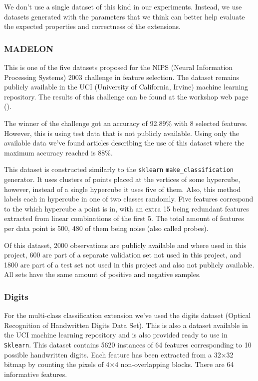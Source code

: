 We don't use a single dataset of this kind in our experiments. Instead, we use datasets generated with the parameters that we think can better help evaluate the expected properties and correctness of the extensions.

\subsubsection*{MADELON}
\label{sec:ch5.data.madelon}

This is one of the five datasets proposed for the NIPS (Neural Information Processing Systems) 2003 challenge in feature selection. The dataset remains publicly available in the UCI (University of California, Irvine) machine learning repository. The results of this challenge can be found at the workshop web page (\cite{guyon_result_2004}).

The winner of the challenge got an accuracy of 92.89\% with 8 selected features. However, this is using test data that is not publicly available. Using only the avail\-able data we've found articles describing the use of this dataset where the maximum accuracy reached is 88\%. 

This dataset is constructed similarly to the \texttt{sklearn} \texttt{make\_classification} gen\-er\-a\-tor. It uses clusters of points placed at the vertices of some hypercube, however, instead of a single hypercube it uses five of them. Also, this method labels each in hypercube in one of two classes randomly. Five features correspond to the which hypercube a point is in, with an extra 15 being redundant features extracted from linear combinations of the first 5. The total amount of features per data point is 500, 480 of them being noise (also called probes).

Of this dataset, 2000 observations are publicly available and where used in this project, 600 are part of a separate validation set not used in this project, and 1800 are part of a test set not used in this project and also not publicly available. All sets have the same amount of positive and negative samples.

\subsubsection*{Digits}

For the multi-class classification extension we've used the digits dataset (Optical Recognition of Handwritten Digits Data Set). This is also a dataset available in the UCI machine learning repository and is also provided ready to use in \texttt{Sklearn}. This dataset contains 5620 instances of 64 features corresponding to 10 possible handwritten digits. Each feature has been extracted from a 32×32 bitmap by count\-ing the pixels of 4×4 non-overlapping blocks. There are 64 informative features.

